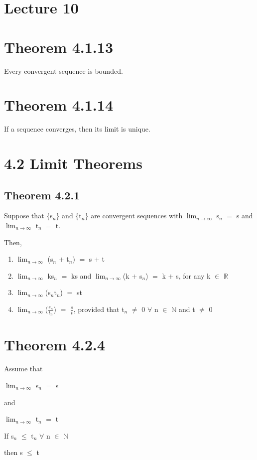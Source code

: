 \documentclass{article}
\newcommand{\mt}[1]{\ensuremath{#1}}
\newcommand\bsc[2][\DefaultOpt]{%
  \def\DefaultOpt{#2}%
  \section[#1]{#2}%
}
\newcommand\ssc[2][\DefaultOpt]{%
  \def\DefaultOpt{#2}%
  \subsection[#1]{#2}%
}
\newcommand{\balist}{\begin{enumerate}[label=\alph*.]}
\newcommand{\elist}{\end{enumerate}}
\newcommand{\br}{\mt{\mathbb{R}} }       %
\newcommand{\bn}{\mt{\mathbb{N}} }       %
\newcommand{\fa}{\mt{\forall} }          %
\newcommand{\mem}{\mt{\in} }
\newcommand{\eql}{\mt{=} }
\newcommand{\uw}[2]{#1\mt{_{#2}}}
\newcommand{\frc}[2]{\mt{\frac{#1}{#2}}}
\newcommand{\lmti}[1]{\mt{\displaystyle{\lim_{#1 \to \infty}}}}
\begin{document}
\bsc{Lecture 10}{
\bsc{Theorem 4.1.13}{

Every convergent sequence is bounded.
}

\bsc{Theorem 4.1.14}{

If a sequence converges, then its limit is unique.
}

\bsc{4.2 Limit Theorems}{

\ssc{Theorem 4.2.1}{

Suppose that \{\uw{s}{n}\} and \{\uw{t}{n}\} are convergent sequences with \lmti{n} \uw{s}{n} \eql s and \lmti{n} \uw{t}{n} \eql t.

Then,

\balist
\item \lmti{n} (\uw{s}{n} $+$ \uw{t}{n}) \eql s $+$ t
\item \lmti{n} k\uw{s}{n} \eql ks and \lmti{n}(k $+$ \uw{s}{n}) \eql k $+$ s, for any k \mem \br
\item \lmti{n}(\uw{s}{n}\uw{t}{n}) \eql st
\item \lmti{n}(\frc{\uw{s}{n}}{\uw{t}{n}}) \eql \frc{s}{t}, provided that \uw{t}{n} $\neq$ 0 \fa n \mem \bn and t $\neq$ 0
\elist

}

\bsc{Theorem 4.2.4}{

Assume that

\lmti{n} \uw{s}{n} \eql s

and

\lmti{n} \uw{t}{n} \eql t

If \uw{s}{n} $\leq$ \uw{t}{n} \fa n \mem \bn

then s $\leq$ t

}
}

}
\end{document}

